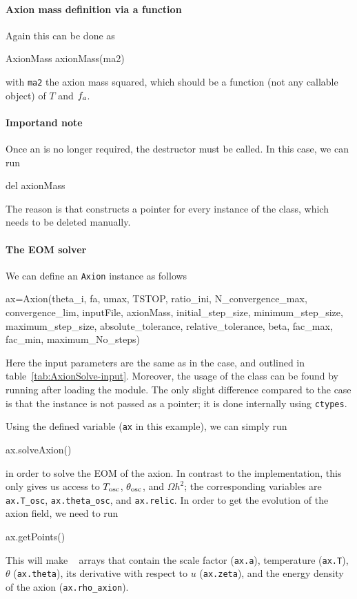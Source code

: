 \documentclass[11pt,a4paper]{article}
\begin{document}
\paragraph{Axion mass definition via a function}
%
Again this can be done as
%
\begin{py}
	AxionMass axionMass(ma2)
\end{py}
%
with {\tt ma2} the axion mass squared, which should be a function (not any callable object) of $T$ and $f_{a}{}$.

\paragraph{Importand note} Once an  is no longer required, the destructor must be called. In this case, we can run
%
\begin{py}
	del axionMass
\end{py}
%
The reason is that \mimes constructs a pointer for every instance of the class, which needs to be deleted manually.  

\paragraph{The EOM solver}
%
We can define an {\tt Axion} instance as follows 
%
\begin{py}
	ax=Axion(theta_i, fa, umax, TSTOP, ratio_ini, N_convergence_max, convergence_lim, 
		inputFile, axionMass, initial_step_size, minimum_step_size, maximum_step_size, 
		absolute_tolerance, relative_tolerance, beta, fac_max, fac_min, maximum_No_steps)
\end{py}
%
Here the input parameters are the same as in the \CPP case, and outlined in table~\ref{tab:AxionSolve-input}. Moreover, the usage of the class can be found by running  after loading the module. The only slight difference compared to the \CPP case is that the  instance is not passed as a pointer; it is done internally using {\tt ctypes}. 


Using the defined variable ({\tt ax} in this example), we can simply run  
%
\begin{py}
	ax.solveAxion()
\end{py}
%
in order to solve the EOM of the axion. In contrast to the \CPP implementation, this only gives us access to $T_{\rm osc}{}$, $\theta_{\rm osc}{}$, and $\Omega h^2$; the corresponding variables are {\tt ax.T\_osc}, {\tt ax.theta\_osc}, and {\tt ax.relic}. In order to get the evolution of the axion field, we need to run 
%
\begin{py}
	ax.getPoints()
\end{py}
%
This will make ~\cite{harris2020array} arrays that contain the scale factor ({\tt ax.a}), temperature ({\tt ax.T}), $\theta$ ({\tt ax.theta}), its derivative with respect to $u$ ({\tt ax.zeta}), and the energy density of the axion ({\tt ax.rho\_axion}).
\end{document}
